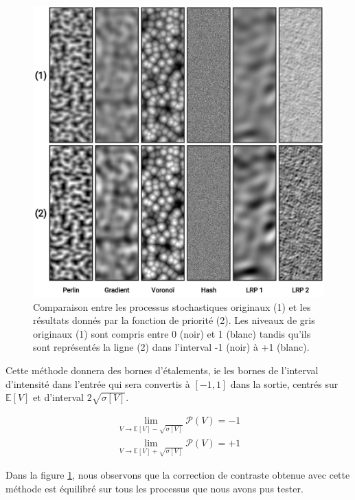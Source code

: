 \documentclass[9pt, twocolumn]{article} %
\begin{document}
\begin{figure}
  \includegraphics[width=\linewidth]{figures/MixMax_Priority.png}
  \caption{Comparaison entre les processus stochastiques originaux (1) et les résultats donnés par la fonction de priorité (2). Les niveaux de gris originaux (1) sont compris entre 0 (noir) et 1 (blanc) tandis qu'ils sont représentés la ligne (2) dans l'interval -1 (noir) à +1 (blanc).
  }
  \label{fig::MixMax_Priority}
\end{figure}

Cette méthode donnera des bornes d'étalements, ie les bornes de l'interval
d'intensité dans l'entrée qui sera convertis à $[-1, 1]$ dans la sortie,
centrés sur $\mathbb{E}[V]$ et d'interval $2\sqrt{\sigma[V]}$.

\begin{equation}\label{PriorityBornes2}
  \begin{split}
    \lim_{V \rightarrow \mathbb{E}[V] - \sqrt{\sigma[V]}}\mathcal{P}(V) = -1
    \\
    \lim_{V \rightarrow \mathbb{E}[V] + \sqrt{\sigma[V]}}\mathcal{P}(V) = +1
  \end{split}
\end{equation}

Dans la figure \ref{fig::MixMax_Priority}, nous observons que la correction de
contraste obtenue avec cette méthode est équilibré sur tous les processus que
nous avons pus tester.
\end{document}
